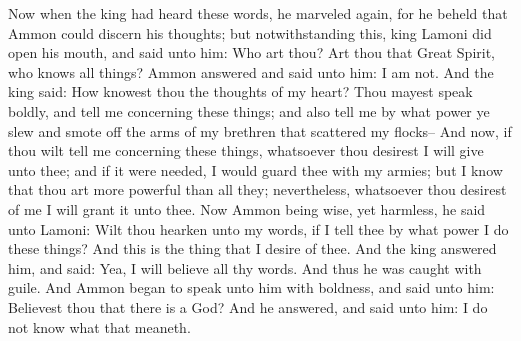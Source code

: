 Now when the king had heard these words, he marveled again, for he beheld that Ammon could discern his thoughts; but notwithstanding this, king Lamoni did open his mouth, and said unto him: Who art thou? Art thou that Great Spirit, who knows all things?
\bverse \iffalse Ammon answered and said unto him: I am not. \fi
Ammon answered and said unto him: I am not.
\bverse \iffalse And the king said: How knowest thou the thoughts of my heart?  Thou mayest speak boldly, and tell me concerning these things; and also tell me by what power ye slew and smote off the arms of my brethren that scattered my flocks-- \fi
And the king said: How knowest thou the thoughts of my heart?  Thou mayest speak boldly, and tell me concerning these things; and also tell me by what power ye slew and smote off the arms of my brethren that scattered my flocks--
\bverse \iffalse And now, if thou wilt tell me concerning these things, whatsoever thou desirest I will give unto thee; and if it were needed, I would guard thee with my armies; but I know that thou art more powerful than all they; nevertheless, whatsoever thou desirest of me I will grant it unto thee. \fi
And now, if thou wilt tell me concerning these things, whatsoever thou desirest I will give unto thee; and if it were needed, I would guard thee with my armies; but I know that thou art more powerful than all they; nevertheless, whatsoever thou desirest of me I will grant it unto thee.
\bverse \iffalse Now Ammon being wise, yet harmless, he said unto Lamoni: Wilt thou hearken unto my words, if I tell thee by what power I do these things? And this is the thing that I desire of thee. \fi
Now Ammon being wise, yet harmless, he said unto Lamoni: Wilt thou hearken unto my words, if I tell thee by what power I do these things? And this is the thing that I desire of thee.
\bverse \iffalse And the king answered him, and said: Yea, I will believe all thy words. And thus he was caught with guile. \fi
And the king answered him, and said: Yea, I will believe all thy words. And thus he was caught with guile.
\bverse \iffalse And Ammon began to speak unto him with boldness, and said unto him: Believest thou that there is a God? \fi
And Ammon began to speak unto him with boldness, and said unto him: Believest thou that there is a God?
\bverse \iffalse And he answered, and said unto him: I do not know what that meaneth. \fi
And he answered, and said unto him: I do not know what that meaneth.
\bverse \iffalse And then Ammon said: Believest thou that there is a Great Spirit? \fi
